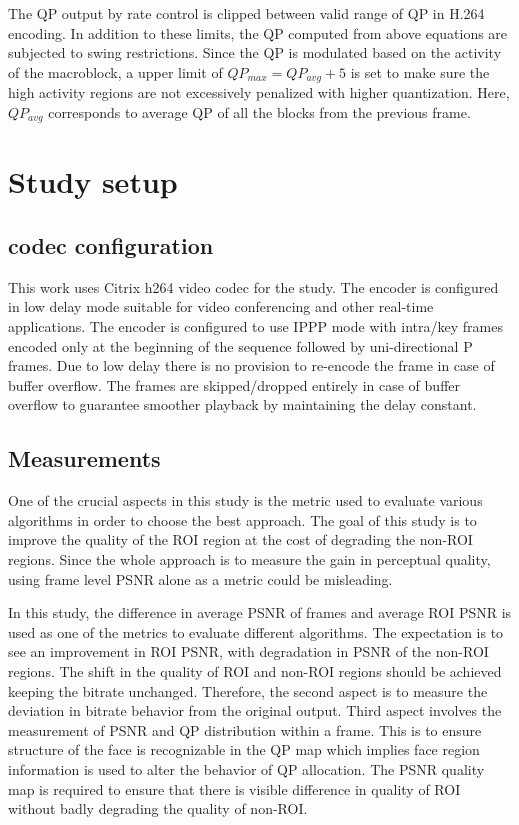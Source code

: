 \documentclass[11pt]{article} %
\begin{document}
The QP output by rate control is clipped between valid range of QP in H.264 encoding. In addition to these limits, the QP computed from above equations are subjected to swing restrictions. Since the QP is modulated based on the activity of the macroblock, a upper limit of $QP_{max} = QP_{avg} + 5$ is set to make sure the high activity regions are not excessively penalized with higher quantization. Here, $QP_{avg}$ corresponds to average QP of all the blocks from the previous frame.

\section{Study setup}
\subsection{codec configuration}      
This work uses Citrix h264 video codec for the study. The encoder is configured in low delay mode suitable for video conferencing and other real-time applications. The encoder is configured to use IPPP mode with intra/key frames encoded only at the beginning of the sequence followed by uni-directional P frames. Due to low delay there is no provision to re-encode the frame in case of buffer overflow. The frames are skipped/dropped entirely in case of buffer overflow to guarantee smoother playback by maintaining the delay constant. 
\subsection{Measurements}
One of the crucial aspects in this study is the metric used to evaluate various algorithms in order to choose the best approach. The goal of this study is to improve the quality of the ROI region at the cost of degrading the non-ROI regions. Since the whole approach is to measure the gain in perceptual quality, using frame level PSNR alone as a metric could be misleading. 

In this study, the difference in average PSNR of frames and average ROI PSNR is used as one of the metrics to evaluate different algorithms. The expectation is to see an improvement in ROI PSNR, with degradation in PSNR of the non-ROI regions. The shift in the quality of ROI and non-ROI regions should be achieved keeping the bitrate unchanged. Therefore, the second aspect is to measure the deviation in bitrate behavior from the original output. Third aspect involves the measurement of PSNR and QP distribution within a frame. This is to ensure structure of the face is recognizable in the QP map which implies face region information is used to alter the behavior of QP allocation. The PSNR quality map is required to ensure that there is visible difference in quality of ROI without badly degrading the quality of non-ROI. 
\end{document}
